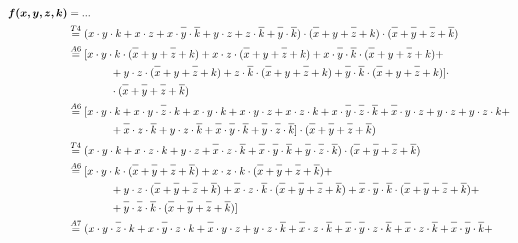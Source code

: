 \documentclass{article}
\newcommand*{\oline}[1]{\overline{#1\mathstrut}}
\newcommand{\bigspace}{\quad\quad\quad\quad}
\begin{document}
\begin{align*}
  \bm{f(x,y,z,k)} &= ...\\
  &\overset{T4}{=} (x \cdot y \cdot k + x \cdot z + x \cdot \oline{y} \cdot \oline{k} + y \cdot z + z \cdot \oline{k} + \oline{y} \cdot \oline{k}) \cdot (\oline{x}+y+\oline{z}+k) \cdot  (\oline{x}+\oline{y}+\oline{z}+\oline{k})\\
  &\overset{A6}{=} [x \cdot y \cdot k \cdot (\oline{x}+y+\oline{z}+k) + x \cdot z \cdot (\oline{x}+y+\oline{z}+k) + x \cdot \oline{y} \cdot \oline{k} \cdot (\oline{x}+y+\oline{z}+k) +\\
  &\bigspace + y \cdot z \cdot (\oline{x}+y+\oline{z}+k) + z \cdot \oline{k} \cdot (\oline{x}+y+\oline{z}+k) + \oline{y} \cdot \oline{k} \cdot (\oline{x}+y+\oline{z}+k)] \cdot\\
  &\bigspace \cdot (\oline{x}+\oline{y}+\oline{z}+\oline{k})\\
  &\overset{A6}{=} [x \cdot y \cdot k + x \cdot y \cdot \oline{z} \cdot k + x \cdot y \cdot k + x \cdot y \cdot z + x \cdot z \cdot k + x \cdot \oline{y} \cdot \oline{z} \cdot \oline{k} + \oline{x} \cdot y \cdot z + y \cdot z + y \cdot z \cdot k +\\
  &\bigspace + \oline{x} \cdot z \cdot \oline{k} + y \cdot z \cdot \oline{k} + \oline{x} \cdot \oline{y} \cdot \oline{k} + \oline{y} \cdot \oline{z} \cdot \oline{k}] \cdot (\oline{x}+\oline{y}+\oline{z}+\oline{k})\\
  &\overset{T4}{=} (x \cdot y \cdot k + x \cdot z \cdot k + y \cdot z + \oline{x} \cdot z \cdot \oline{k} + \oline{x} \cdot \oline{y} \cdot \oline{k} + \oline{y} \cdot \oline{z} \cdot \oline{k}) \cdot (\oline{x}+\oline{y}+\oline{z}+\oline{k})\\
  &\overset{A6}{=} [x \cdot y \cdot k \cdot (\oline{x}+\oline{y}+\oline{z}+\oline{k}) + x \cdot z \cdot k \cdot (\oline{x}+\oline{y}+\oline{z}+\oline{k}) +\\
  &\bigspace + y \cdot z \cdot (\oline{x}+\oline{y}+\oline{z}+\oline{k}) + \oline{x} \cdot z \cdot \oline{k} \cdot (\oline{x}+\oline{y}+\oline{z}+\oline{k}) + \oline{x} \cdot \oline{y} \cdot \oline{k} \cdot (\oline{x}+\oline{y}+\oline{z}+\oline{k}) +\\
  &\bigspace + \oline{y} \cdot \oline{z} \cdot \oline{k} \cdot (\oline{x}+\oline{y}+\oline{z}+\oline{k})]\\
  &\overset{A7}{=} (x \cdot y \cdot \oline{z} \cdot k + x \cdot \oline{y} \cdot z \cdot k + \oline{x} \cdot y \cdot z + y \cdot z \cdot \oline{k} + \oline{x} \cdot z \cdot \oline{k} + \oline{x} \cdot \oline{y} \cdot z \cdot \oline{k} + \oline{x} \cdot z \cdot \oline{k} + \oline{x} \cdot \oline{y} \cdot \oline{k} +\\

\end{align*}
\end{document}
